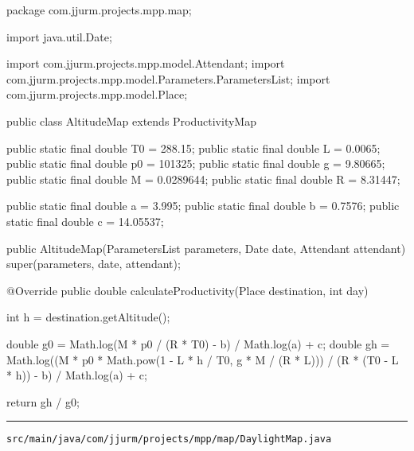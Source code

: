 \begin{javacode}
package com.jjurm.projects.mpp.map;

import java.util.Date;

import com.jjurm.projects.mpp.model.Attendant;
import com.jjurm.projects.mpp.model.Parameters.ParametersList;
import com.jjurm.projects.mpp.model.Place;

public class AltitudeMap extends ProductivityMap {

  public static final double T0 = 288.15;
  public static final double L = 0.0065;
  public static final double p0 = 101325;
  public static final double g = 9.80665;
  public static final double M = 0.0289644;
  public static final double R = 8.31447;

  public static final double a = 3.995;
  public static final double b = 0.7576;
  public static final double c = 14.05537;

  public AltitudeMap(ParametersList parameters, Date date, Attendant attendant) {
    super(parameters, date, attendant);
  }

  @Override
  public double calculateProductivity(Place destination, int day) {
    int h = destination.getAltitude();

    double g0 = Math.log(M * p0 / (R * T0) - b) / Math.log(a) + c;
    double gh =
        Math.log((M * p0 * Math.pow(1 - L * h / T0, g * M / (R * L))) / (R * (T0 - L * h)) - b)
            / Math.log(a) + c;

    return gh / g0;
  }

}
\end{javacode}

\noindent\rule{\textwidth}{0.4pt}

\nointerlineskip
\texttt{src/main/java/com/jjurm/projects/mpp/map/DaylightMap.java}

